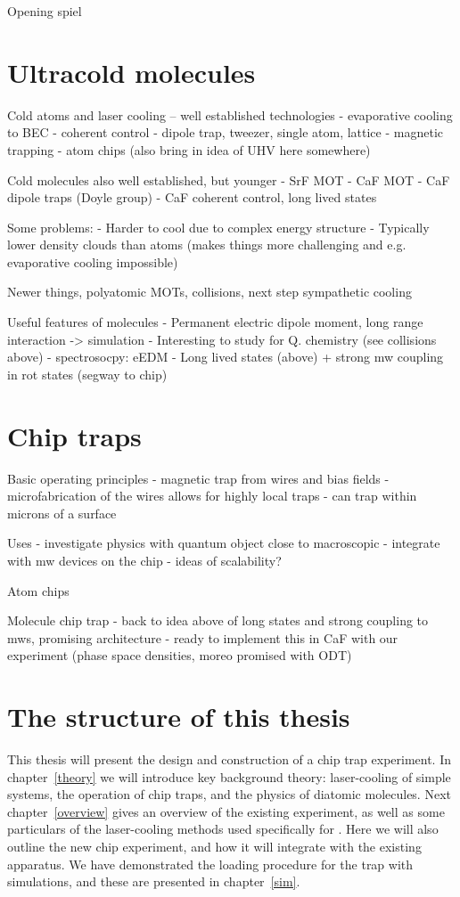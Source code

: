 Opening spiel

\section{Ultracold molecules}

Cold atoms and laser cooling -- well established technologies
- evaporative cooling to BEC
- coherent control
- dipole trap, tweezer, single atom, lattice
- magnetic trapping
- atom chips
(also bring in idea of UHV here somewhere)

Cold molecules also well established, but younger
- SrF MOT
- CaF MOT
- CaF dipole traps (Doyle group)
- CaF coherent control, long lived states

Some problems:
- Harder to cool due to complex energy structure
- Typically lower density clouds than atoms (makes things more challenging and
e.g. evaporative cooling impossible)

Newer things, polyatomic MOTs, collisions, next step sympathetic cooling

Useful features of molecules
- Permanent electric dipole moment, long range interaction -> simulation
- Interesting to study for Q. chemistry (see collisions above)
- spectrosocpy: eEDM
- Long lived states (above) + strong mw coupling in rot states (segway to chip)

\section{Chip traps}

Basic operating principles
- magnetic trap from wires and bias fields
- microfabrication of the wires allows for highly local traps
- can trap within microns of a surface

Uses
- investigate physics with quantum object close to macroscopic
- integrate with mw devices on the chip
- ideas of scalability?

Atom chips

Molecule chip trap
- back to idea above of long states and strong coupling to mws, promising
architecture \cite{Andre2006}
- ready to implement this in CaF with our experiment (phase space densities,
moreo promised with ODT)

\section{The structure of this thesis}

This thesis will present the design and construction of a \CaF{} chip trap
experiment. In chapter~\ref{theory} we will introduce key background theory: 
laser-cooling of simple systems, the operation of chip traps, and the physics
of diatomic molecules. Next chapter~\ref{overview} gives an overview of the
existing \CaF{} experiment, as well as some particulars of the laser-cooling
methods used specifically for \CaF{}. Here we will also outline the new chip
experiment, and how it will integrate with the existing apparatus. We have
demonstrated the loading procedure for the trap with simulations, and these are
presented in chapter~\ref{sim}.

